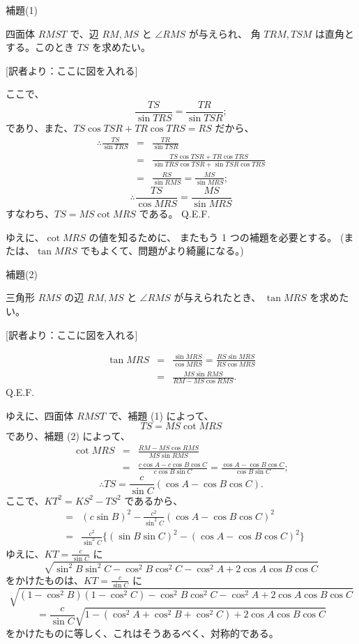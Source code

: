 補題(1)

四面体 $RMST$ で、辺 $RM, MS$ と $\angle RMS$ が与えられ、
角 $TRM, TSM$ は直角とする。このとき $TS$ を求めたい。

[訳者より：ここに図を入れる] 

ここで、
\[
\frac{TS}{\sin TRS} = \frac{TR}{\sin TSR};
\]
であり、また、$TS \cos TSR + TR \cos TRS = RS$ だから、
\begin{eqnarray*}
\therefore
\frac{TS}{\sin TRS} &=& \frac{TR}{\sin TSR}\\
&=&
\frac{TS \cos TSR + TR \cos TRS}{\sin TRS \cos TSR + \sin TSR \cos TRS}\\
&=&
\frac{RS}{\sin RMS} = \frac{MS}{\sin MRS};
\end{eqnarray*}
\[
\therefore
\frac{TS}{\cos MRS} = \frac{MS}{\sin MRS}
\]
すなわち、$TS = MS \cot MRS$ である。
Q.E.F.

ゆえに、$\cot MRS$ の値を知るために、
またもう 1 つの補題を必要とする。
(または、$\tan MRS$ でもよくて、問題がより綺麗になる。)

補題(2)

三角形 $RMS$ の辺 $RM, MS$ と $\angle RMS$ が与えられたとき、
$\tan MRS$ を求めたい。

[訳者より：ここに図を入れる] 

\begin{eqnarray*}
\tan MRS &=& \frac{\sin MRS}{\cos MRS}
 = \frac{RS \sin MRS}{RS \cos MRS}\\
&=& \frac{MS \sin RMS}{RM - MS \cos RMS}.
\end{eqnarray*}
Q.E.F.

ゆえに、四面体 $RMST$ で、補題 (1) によって、
\[
TS = MS \cot MRS
\]
であり、補題 (2) によって、
\begin{eqnarray*}
\cot MRS &=& \frac{RM - MS \cos RMS}{MS \sin RMS}\\
&=&
\frac{c \cos A - c \cos B \cos C}{c \cos B \sin C}
= \frac{\cos A - \cos B \cos C}{\cos B \sin C};
\end{eqnarray*}
\[
\therefore
TS = \frac{c}{\sin C} (\cos A - \cos B \cos C).
\]
ここで、$KT^2 = KS^2 - TS^2$ であるから、
\begin{eqnarray*}
&=& (c \sin B)^2 - \frac{c^2}{\sin^2 C} (\cos A - \cos B \cos C)^2\\
&=&
 \frac{c^2}{\sin^2 C} \{ (\sin B \sin C)^2 - (\cos A - \cos B \cos C)^2 \}
\end{eqnarray*}
ゆえに、$KT = \frac{c}{\sin C}$ に
\[
\sqrt{\sin^2 B \sin^2 C - \cos^2 B \cos^2 C - \cos^2 A + 2 \cos A \cos B \cos C}
\]
をかけたものは、$KT = \frac{c}{\sin C}$ に
\[
\sqrt{(1 - \cos^2 B)(1 -  \cos^2 C) - \cos^2 B \cos^2 C - \cos^2 A + 2 \cos A \cos B \cos C}
\]
\[
= \frac{c}{\sin C} \sqrt{1 - (\cos^2 A + \cos^2 B + \cos^2 C) + 2 \cos A \cos B \cos C}
\]
をかけたものに等しく、これはそうあるべく、対称的である。


